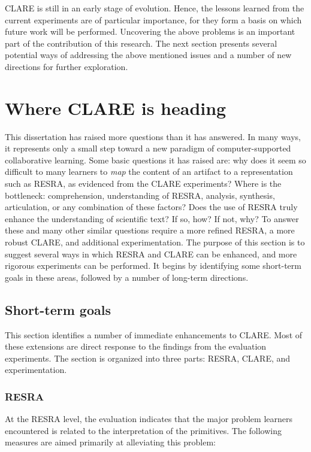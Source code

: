 CLARE is still in an early stage of evolution. Hence, the lessons learned
from the current experiments are of particular importance, for they form a
basis on which future work will be performed. Uncovering the above problems
is an important part of the contribution of this research. The next section
presents several potential ways of addressing the above mentioned issues
and a number of new directions for further exploration.


\section{Where CLARE is heading}
\label{sec:future-directions}

This dissertation has raised more questions than it has answered. In many
ways, it represents only a small step toward a new paradigm of
computer-supported collaborative learning. Some basic questions it has
raised are: why does it seem so difficult to many learners to {\it map\/} the
content of an artifact to a representation such as RESRA, as evidenced from
the CLARE experiments? Where is the bottleneck: comprehension,
understanding of RESRA, analysis, synthesis, articulation, or any
combination of these factors? Does the use of RESRA truly enhance the
understanding of scientific text? If so, how? If not, why? To answer these
and many other similar questions require a more refined RESRA, a more
robust CLARE, and additional experimentation. The purpose of this section
is to suggest several ways in which RESRA and CLARE can be enhanced, and
more rigorous experiments can be performed. It begins by identifying some
short-term goals in these areas, followed by a number of long-term
directions.

\subsection{Short-term goals}

This section identifies a number of immediate enhancements to CLARE. Most
of these extensions are direct response to the findings from the evaluation
experiments. The section is organized into three parts: RESRA, CLARE, and
experimentation.

\subsubsection{RESRA}

At the RESRA level, the evaluation indicates that the major problem
learners encountered is related to the interpretation of the primitives.
The following measures are aimed primarily at alleviating this problem:

